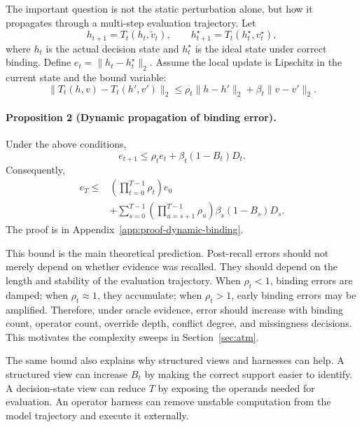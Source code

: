 The important question is not the static perturbation alone, but how it propagates through a multi-step evaluation trajectory.
Let
\begin{equation}
h_{t+1}=T_t(h_t,\tilde v_t),
\qquad
h_{t+1}^{\star}=T_t(h_t^\star,v_t^\star),
\label{eq:evaluation-dynamics}
\end{equation}
where $h_t$ is the actual decision state and $h_t^\star$ is the ideal state under correct binding.
Define $e_t=\lVert h_t-h_t^\star\rVert_2$.
Assume the local update is Lipschitz in the current state and the bound variable:
\begin{equation}
\lVert T_t(h,v)-T_t(h',v')\rVert_2
\le
\rho_t\lVert h-h'\rVert_2+\beta_t\lVert v-v'\rVert_2 .
\label{eq:transition-lipschitz}
\end{equation}

\paragraph{Proposition 2 (Dynamic propagation of binding error).}
Under the above conditions,
\begin{equation}
e_{t+1}
\le
\rho_t e_t+\beta_t(1-B_t)D_t .
\label{eq:dynamic-one-step}
\end{equation}
Consequently,
\begin{equation}
\begin{aligned}
e_T
\le&
\left(\prod_{t=0}^{T-1}\rho_t\right)e_0\\
&+
\sum_{s=0}^{T-1}
\left(\prod_{u=s+1}^{T-1}\rho_u\right)
\beta_s(1-B_s)D_s .
\end{aligned}
\label{eq:dynamic-unrolled}
\end{equation}
The proof is in Appendix~\ref{app:proof-dynamic-binding}.

This bound is the main theoretical prediction.
Post-recall errors should not merely depend on whether evidence was recalled.
They should depend on the length and stability of the evaluation trajectory.
When $\rho_t<1$, binding errors are damped; when $\rho_t\approx1$, they accumulate; when $\rho_t>1$, early binding errors may be amplified.
Therefore, under oracle evidence, error should increase with binding count, operator count, override depth, conflict degree, and missingness decisions.
This motivates the complexity sweeps in Section~\ref{sec:atm}.

The same bound also explains why structured views and harnesses can help.
A structured view can increase $B_t$ by making the correct support easier to identify.
A decision-state view can reduce $T$ by exposing the operands needed for evaluation.
An operator harness can remove unstable computation from the model trajectory and execute it externally.

